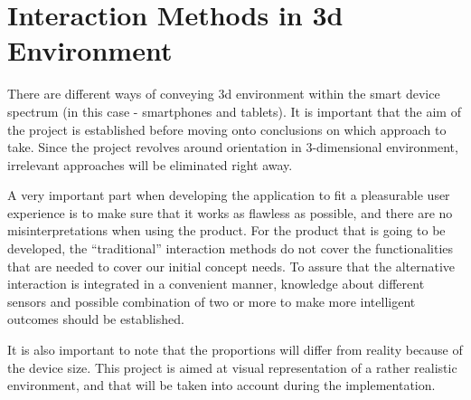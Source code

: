 \section{Interaction Methods in 3d Environment}
There are different ways of conveying 3d environment within the smart device spectrum (in this case - smartphones and tablets). It is important that the aim of the project is established before moving onto conclusions on which approach to take. Since the project revolves around orientation in 3-dimensional environment,  irrelevant approaches will be eliminated right away.

A very important part when developing the application to fit a pleasurable user experience is to make sure that it works as flawless as possible, and there are no misinterpretations when using the product. For the product that is going to be developed, the “traditional” interaction methods do not cover the functionalities that are needed to cover our initial concept needs. To assure that the alternative interaction is integrated in a convenient manner, knowledge about different sensors and possible combination of two or more to make more intelligent outcomes should be established.

It is also important to note that the proportions will differ from reality because of the device size. This project is aimed at visual representation of a rather realistic environment, and that will be taken into account during the implementation. 

